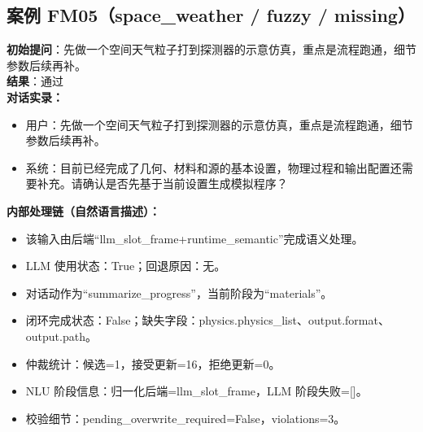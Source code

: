 \documentclass[11pt]{ctexart}
\begin{document}
\subsection{案例 FM05（space\_weather / fuzzy / missing）}
\textbf{初始提问}：先做一个空间天气粒子打到探测器的示意仿真，重点是流程跑通，细节参数后续再补。\\
\textbf{结果}：通过\\
\textbf{对话实录：}
\begin{itemize}
\item 用户：先做一个空间天气粒子打到探测器的示意仿真，重点是流程跑通，细节参数后续再补。
\item 系统：目前已经完成了几何、材料和源的基本设置，物理过程和输出配置还需要补充。请确认是否先基于当前设置生成模拟程序？
\end{itemize}
\textbf{内部处理链（自然语言描述）：}
\begin{itemize}
\item 该输入由后端“llm\_slot\_frame+runtime\_semantic”完成语义处理。
\item LLM 使用状态：True；回退原因：无。
\item 对话动作为“summarize\_progress”，当前阶段为“materials”。
\item 闭环完成状态：False；缺失字段：physics.physics\_list、output.format、output.path。
\item 仲裁统计：候选=1，接受更新=16，拒绝更新=0。
\item NLU 阶段信息：归一化后端=llm\_slot\_frame，LLM 阶段失败=[]。
\item 校验细节：pending\_overwrite\_required=False，violations=3。
\end{itemize}
\end{document}
